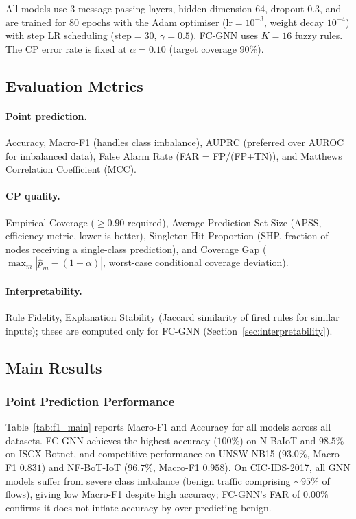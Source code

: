All models use $3$ message-passing layers, hidden dimension $64$, dropout
$0.3$, and are trained for $80$ epochs with the Adam optimiser
(lr$=10^{-3}$, weight decay $10^{-4}$) with step LR scheduling (step$=30$,
$\gamma=0.5$).
FC-GNN uses $K=16$ fuzzy rules.
The CP error rate is fixed at $\alpha = 0.10$ (target coverage $90\%$).

\subsection{Evaluation Metrics}
\label{sec:metrics}

\paragraph{Point prediction.}
Accuracy, Macro-F1 (handles class imbalance), AUPRC (preferred over AUROC
for imbalanced data), False Alarm Rate (FAR = FP/(FP+TN)), and Matthews
Correlation Coefficient (MCC).

\paragraph{CP quality.}
Empirical Coverage ($\ge 0.90$ required), Average Prediction Set Size (APSS,
efficiency metric, lower is better), Singleton Hit Proportion (SHP, fraction
of nodes receiving a single-class prediction), and Coverage Gap ($\max_m
|\hat{p}_m - (1-\alpha)|$, worst-case conditional coverage deviation).

\paragraph{Interpretability.}
Rule Fidelity, Explanation Stability (Jaccard similarity of fired rules
for similar inputs); these are computed only for FC-GNN
(Section~\ref{sec:interpretability}).

\subsection{Main Results}

\subsubsection{Point Prediction Performance}

Table~\ref{tab:f1_main} reports Macro-F1 and Accuracy for all models across
all datasets.
FC-GNN achieves the highest accuracy ($100\%$) on N-BaIoT and $98.5\%$ on
ISCX-Botnet, and competitive performance on UNSW-NB15 ($93.0\%$,
Macro-F1 $0.831$) and NF-BoT-IoT ($96.7\%$, Macro-F1 $0.958$).
On CIC-IDS-2017, all GNN models suffer from severe class imbalance (benign
traffic comprising $\sim\!95\%$ of flows), giving low Macro-F1 despite high
accuracy; FC-GNN's FAR of $0.00\%$ confirms it does not inflate accuracy by
over-predicting benign.


